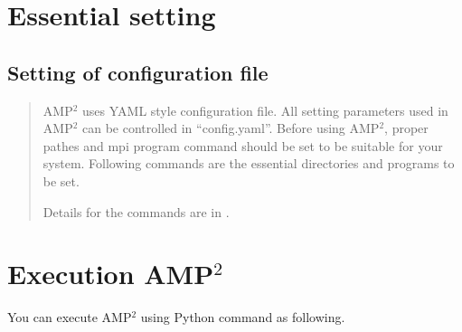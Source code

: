 \documentclass[letterpaper,10pt,english]{sphinxmanual}
\begin{document}
\section{Essential setting}
\label{\detokenize{Installation/Installation:essential-setting}}

\subsection{Setting of configuration file}
\label{\detokenize{Installation/Installation:setting-of-configuration-file}}\begin{quote}

AMP$^{\text{2}}$ uses YAML style configuration file. All setting parameters used in AMP$^{\text{2}}$ can
be controlled in “config.yaml”. Before using AMP$^{\text{2}}$, proper pathes and mpi program command
should be set to be suitable for your system. Following commands are the essential directories
and programs to be set.

\begin{sphinxVerbatim}[commandchars=\\\{\}]
\end{sphinxVerbatim}

Details for the commands are in {\hyperref[\detokenize{Input/Configuration::doc}]{}}.
\end{quote}


\section{Execution AMP$^{\text{2}}$}
\label{\detokenize{Installation/Installation:execution-amp2}}
You can execute AMP$^{\text{2}}$ using Python command as following.
\end{document}
